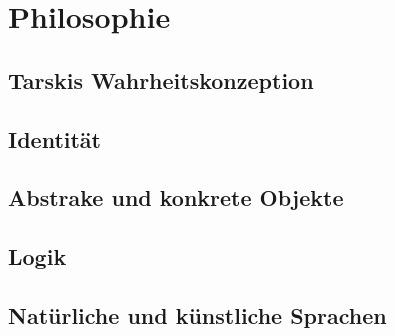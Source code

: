 \chapter{Philosophie}

\section{Tarskis Wahrheitskonzeption}

\section{Identität}


\section{Abstrake und konkrete Objekte}

\section{Logik}

\section{Natürliche und künstliche Sprachen}

